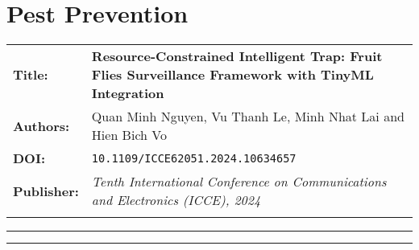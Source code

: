 \documentclass[../main]{subfiles}
\begin{document}
\chapter{Pest Prevention} \label{chp:}

\begin{center}

    \begin{tabularx} {\textwidth} {
            >{\bfseries}m{2.0cm}X
        }

        Title: & \textbf{Resource-Constrained Intelligent Trap: Fruit Flies Surveillance Framework with TinyML Integration}
        \\

        Authors: & Quan Minh Nguyen, Vu Thanh Le, Minh Nhat Lai and Hien Bich Vo
        \\

        DOI: & \texttt{10.1109/ICCE62051.2024.10634657}

        \\

        Publisher: & \textit{Tenth International Conference on Communications and Electronics (ICCE), 2024} \vfill
        \\

        \\


    \end{tabularx}

\end{center}

\begin{center}
    \vspace{-0.75cm}
    \rule{\textwidth}{0.75pt}
\end{center}



\begin{center}
    \vspace{-0.25cm}
    \rule{\textwidth}{0.75pt}
\end{center}





\end{document}
